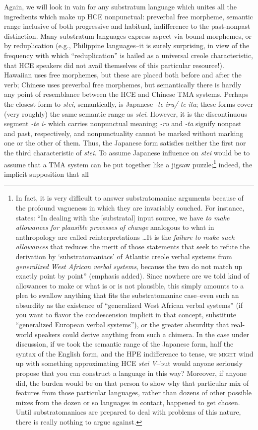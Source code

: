 Again, we will look in vain for any substratum language which unites all the ingredients which make up HCE nonpunctual: preverbal free morpheme, semantic range inclusive of both progressive and habi\-tual, indifference to the past-nonpast distinction. Many substratum languages express aspect via bound morphemes, or by reduplication (e.g., Philippine languages--it is surely surprising, in view of the fre\-quency with which ``reduplication'' is hailed as a universal creole characteristic, that HCE speakers did not avail themselves of this particular resource!). Hawaiian uses free morphemes, but these are placed both before and after the verb; Chinese uses preverbal free morphemes, but semantically there is hardly any point of resemblance between the HCE and Chinese TMA systems. Perhaps the closest form to \textit{stei}, semantically, is Japanese \textit{-te} \textit{iru/-te} \textit{ita}; these forms cover (very roughly) the same semantic range as \textit{stei}. However, it is the discontinuous segment \textit{-te} \textit{i-} which carries nonpunctual meaning; \textit{-ru} and \textit{-ta} signify nonpast and past, respectively, and nonpunctuality cannot be marked without marking one or the other of them. Thus, the Japanese form satisfies neither the first nor the third characteristic of \textit{stei}. To assume Japanese influence on \textit{stei} would be to assume that a TMA system can be put together like a jigsaw puzzle;\footnote{In fact, it is very difficult to answer substratomaniac argu\-ments because of the profound vagueness in which they are invariably couched. For instance, \citet{Alleyne1979} states: ``In dealing with the [substratal] input source, we have \textit{to make allowances for plausible processes of change} analogous to what in anthropology are called reinterpretations \ldots  It is the \textit{failure to make such allowances} that reduces the merit of those statements that seek to refute the derivation by `substratomaniacs' of Atlantic creole verbal systems from \textit{generalized West African verbal systems}, because the two do not match up exactly point by point'' (emphasis added). Since nowhere are we told kind of allowances to make or what is or is not plausible, this simply amounts to a plea to swallow anything that fits the substratomaniac case--even such an absurdity as the existence of ``generalized West African verbal systems'' (if you want to flavor the condescension implicit in that concept, substitute ``generalized European verbal systems''), or the greater absurdity that real-world speakers could derive anything from such a chimera. In the case under discussion, if we took the semantic range of the Japanese form, half the syntax of the English form, and the HPE indifference to tense, we \textsc{might} wind up with something approximating HCE \textit{stei V}--but would anyone seriously propose that you can construct a language in this way? Moreover, if anyone did, the burden would be on that person to show why that particular mix of features from those particular languages, rather than dozens of other possible mixes from the dozen or so lan\-guages in contact, happened to get chosen. Until substratomaniacs are prepared to deal with problems of this nature, there is really nothing to argue against.} indeed, the implicit supposition that all 